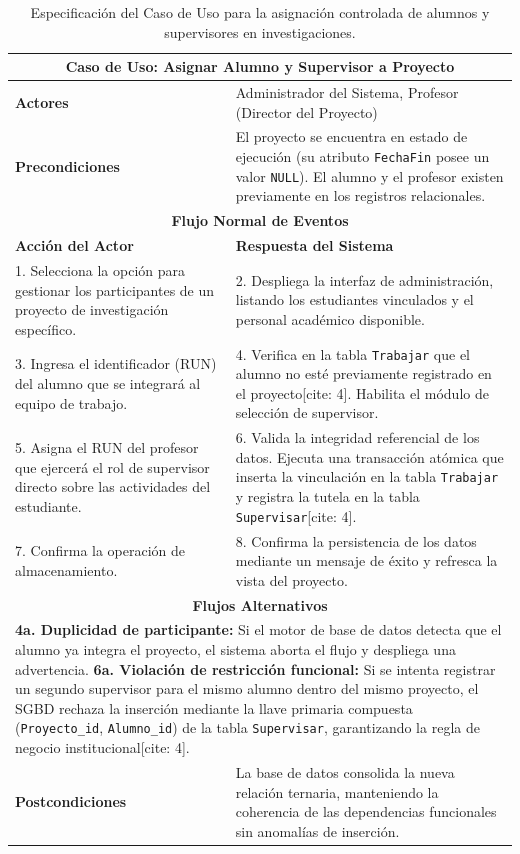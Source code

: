 \begin{table}[H]
	\centering
	\renewcommand{\arraystretch}{1.3}
	\begin{tabular}{|p{}|p{}|}
		\hline
		\multicolumn{2}{|c|}{\textbf{Caso de Uso: Asignar Alumno y Supervisor a Proyecto}} \\ \hline
		\textbf{Actores} & Administrador del Sistema, Profesor (Director del Proyecto) \\ \hline
		\textbf{Precondiciones} & El proyecto se encuentra en estado de ejecución (su atributo \texttt{FechaFin} posee un valor \texttt{NULL}). El alumno y el profesor existen previamente en los registros relacionales. \\ \hline
		\multicolumn{2}{|c|}{\textbf{Flujo Normal de Eventos}} \\ \hline
		\textbf{Acción del Actor} & \textbf{Respuesta del Sistema} \\ \hline
		1. Selecciona la opción para gestionar los participantes de un proyecto de investigación específico. & 2. Despliega la interfaz de administración, listando los estudiantes vinculados y el personal académico disponible. \\ \hline
		3. Ingresa el identificador (RUN) del alumno que se integrará al equipo de trabajo. & 4. Verifica en la tabla \texttt{Trabajar} que el alumno no esté previamente registrado en el proyecto[cite: 4]. Habilita el módulo de selección de supervisor. \\ \hline
		5. Asigna el RUN del profesor que ejercerá el rol de supervisor directo sobre las actividades del estudiante. & 6. Valida la integridad referencial de los datos. Ejecuta una transacción atómica que inserta la vinculación en la tabla \texttt{Trabajar} y registra la tutela en la tabla \texttt{Supervisar}[cite: 4]. \\ \hline
		7. Confirma la operación de almacenamiento. & 8. Confirma la persistencia de los datos mediante un mensaje de éxito y refresca la vista del proyecto. \\ \hline
		\multicolumn{2}{|c|}{\textbf{Flujos Alternativos}} \\ \hline
		\multicolumn{2}{|p{0.9\textwidth}|}{
			\textbf{4a. Duplicidad de participante:} Si el motor de base de datos detecta que el alumno ya integra el proyecto, el sistema aborta el flujo y despliega una advertencia.\newline
			\textbf{6a. Violación de restricción funcional:} Si se intenta registrar un segundo supervisor para el mismo alumno dentro del mismo proyecto, el SGBD rechaza la inserción mediante la llave primaria compuesta (\texttt{Proyecto\_id}, \texttt{Alumno\_id}) de la tabla \texttt{Supervisar}, garantizando la regla de negocio institucional[cite: 4].} \\ \hline
		\textbf{Postcondiciones} & La base de datos consolida la nueva relación ternaria, manteniendo la coherencia de las dependencias funcionales sin anomalías de inserción. \\ \hline
	\end{tabular}
	\caption{Especificación del Caso de Uso para la asignación controlada de alumnos y supervisores en investigaciones.}
	\label{tab:cu_asignar_supervisor}
\end{table}

